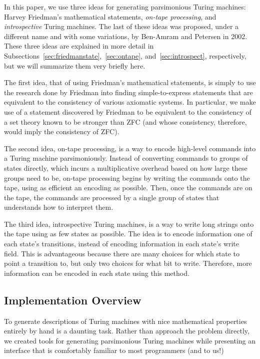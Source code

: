 \documentclass[11pt]{article}
\begin{document}
In this paper, we use three ideas for generating parsimonious Turing machines: Harvey Friedman's mathematical statements, \emph{on-tape processing}, and \emph{introspective} Turing machines. The last of these ideas was proposed, under a different name and with some variations, by Ben-Amram and Petersen in 2002.~\cite{benamram} These three ideas are explained in more detail in Subsections~\ref{sec:friedmanstate},~\ref{sec:ontape}, and~\ref{sec:introspect}, respectively, but we will summarize them very briefly here. 

The first idea, that of using Friedman's mathematical statements, is simply to use the research done by Friedman into finding simple-to-express statements that are equivalent to the consistency of various axiomatic systems. In particular, we make use of a statement discovered by Friedman to be equivalent to the consistency of a set theory known to be stronger than ZFC (and whose consistency, therefore, would imply the consistency of ZFC).~\cite{friedman}

The second idea, on-tape processing, is a way to encode high-level commands into a Turing machine parsimoniously. Instead of converting commands to groups of states directly, which incurs a multiplicative overhead based on how large these groups need to be, on-tape processing begins by writing the commands onto the tape, using as efficient an encoding as possible. Then, once the commands are on the tape, the commands are processed by a single group of states that understands how to interpret them.

The third idea, introspective Turing machines, is a way to write long strings onto the tape using as few states as possible. The idea is to encode information one of each state's transitions, instead of encoding information in each state's write field. This is advantageous because there are many choices for which state to point a transition to, but only two choices for what bit to write. Therefore, more information can be encoded in each state using this method.

\subsection{Implementation Overview}

To generate descriptions of Turing machines with nice mathematical properties entirely by hand is a daunting task. Rather than approach the problem directly, we created tools for generating parsimonious Turing machines while presenting an interface that is comfortably familiar to most programmers (and to us!) 
\end{document}
